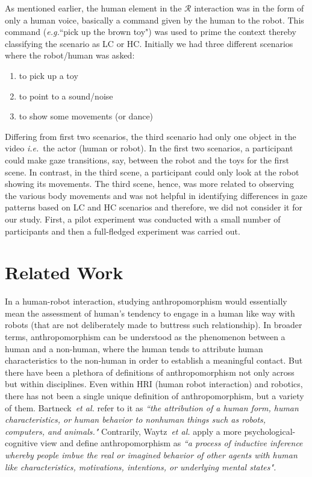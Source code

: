 \documentclass[a4,twocolumn,10pt]{article}
\newcommand{\eg}{{\textit{e.g.\xspace}}}
\newcommand{\etal}{{\textit{et al.\xspace}}}
\newcommand{\ie}{{\textit{i.e.\xspace}}}
\begin{document}
As mentioned earlier, the human element in the $\mathcal{R}$ interaction was in
the form of only a human voice, basically a command given by the human to the
robot. This command (\eg ``pick up the brown toy") was used to prime
the context thereby classifying the scenario as LC or HC. Initially we had three
different scenarios where the robot/human was asked:

\begin{enumerate}
    \item to pick up a toy
    \item to point to a sound/noise
    \item to show some movements (or dance)
\end{enumerate}

Differing from first two scenarios, the third scenario had only one object in
the video \ie~the actor (human or robot). In the first two scenarios, a
participant could make gaze transitions, say, between the robot and the toys for
the first scene. In contrast, in the third scene, a participant could only look
at the robot showing its movements. The third scene, hence, was more related to
observing the various body movements and was not helpful in identifying
differences in gaze patterns based on LC and HC scenarios and therefore, we did
not consider it for our study. First, a pilot experiment was conducted with a
small number of participants and then a full-fledged experiment was carried out.

\section{Related Work}

In a human-robot interaction, studying anthropomorphism would essentially mean
the assessment of human's tendency to engage in a human like way with robots
(that are not deliberately made to buttress such relationship). In broader
terms, anthropomorphism can be understood as the phenomenon between a human and
a non-human, where the human tends to attribute human characteristics to the
non-human in order to establish a meaningful contact\cite{fink2014dynamics}. But
there have been a plethora of definitions of anthropomorphism not only across
but within disciplines\cite{duffy_anthropomorphism_2002}. Even
within HRI (human robot interaction) and robotics, there has not been a single
unique definition of anthropomorphism, but a variety of them.
Bartneck~\etal\cite{bartneck_measurement_2008} refer to it as \emph{``the
attribution of a human form, human characteristics, or human behavior to
nonhuman things such as robots, computers, and animals."} Contrarily,
Waytz~\etal\cite{Waytz2010} apply a more psychological-cognitive view and
define anthropomorphism as \textit{``a process of inductive inference whereby
    people imbue the real or imagined behavior of other agents with human like
    characteristics, motivations, intentions, or underlying mental states".} 
\end{document}
